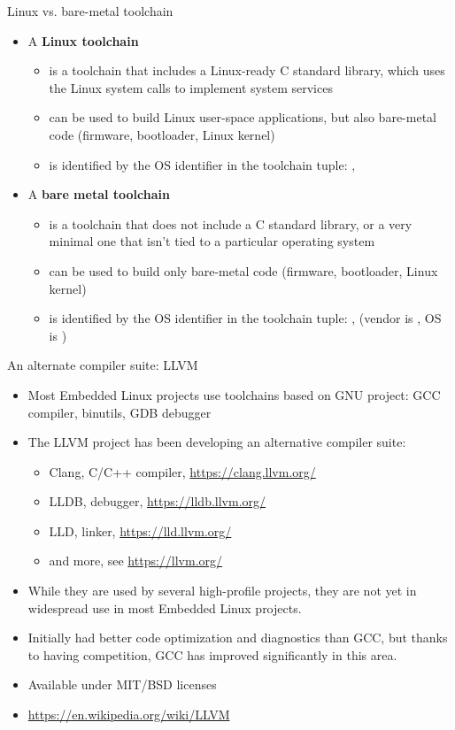 \begin{frame}{Linux vs. bare-metal toolchain}
  \begin{itemize}
  \item A {\bf Linux toolchain}
    \begin{itemize}
    \item is a toolchain that includes a Linux-ready C standard library, which
      uses the Linux system calls to implement system services
    \item can be used to build Linux user-space applications, but also
      bare-metal code (firmware, bootloader, Linux kernel)
    \item is identified by the  OS identifier in the
      toolchain tuple: ,
    \end{itemize}
  \item A {\bf bare metal toolchain}
    \begin{itemize}
    \item is a toolchain that does not include a C standard library, or a very
      minimal one that isn't tied to a particular operating
      system
    \item can be used to build only bare-metal code (firmware,
      bootloader, Linux kernel)
    \item is identified by the  OS identifier in the
      toolchain tuple: , 
      (vendor is , OS is )
    \end{itemize}
  \end{itemize}
\end{frame}

\begin{frame}{An alternate compiler suite: LLVM}
  \begin{itemize}
  \item Most Embedded Linux projects use toolchains based on GNU
    project: GCC compiler, binutils, GDB debugger
  \item The LLVM project has been developing an alternative compiler
    suite:
    \begin{itemize}
    \item Clang, C/C++ compiler, \url{https://clang.llvm.org/}
    \item LLDB, debugger, \url{https://lldb.llvm.org/}
    \item LLD, linker, \url{https://lld.llvm.org/}
    \item and more, see \url{https://llvm.org/}
    \end{itemize}
  \item While they are used by several high-profile projects, they are
    not yet in widespread use in most Embedded Linux projects.
  \item Initially had better code optimization and diagnostics than
    GCC, but thanks to having competition, GCC has improved
    significantly in this area.
  \item Available under MIT/BSD licenses
  \item \url{https://en.wikipedia.org/wiki/LLVM}
  \end{itemize}
\end{frame}
